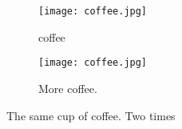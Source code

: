 \documentclass{article}
\begin{document}
	\begin{figure}[h!]
	\centering
	\begin{subfigure}[b]{0.4\linewidth}
		
	\texttt{[image: coffee.jpg]}
	\caption{coffee}
\end{subfigure}
\begin{subfigure}[b]{0.4\linewidth}
	\texttt{[image: coffee.jpg]}
	\caption{More coffee.}
\end{subfigure}
\caption{The same cup of coffee. Two times}
	\label{fig:coffee}
	\end{figure}
	
\end{document}
